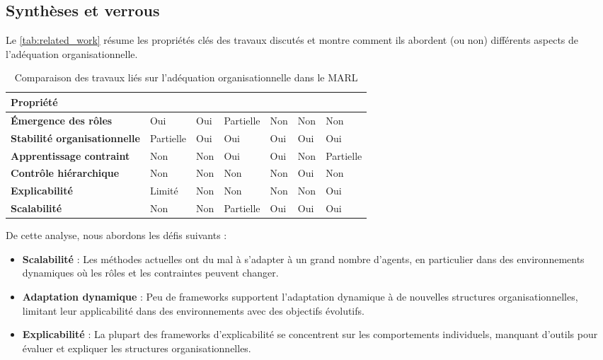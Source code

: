 \documentclass[sigconf,anonymous]{aamas}
\begin{document}
\subsection{Synthèses et verrous}
Le \autoref{tab:related_work} résume les propriétés clés des travaux discutés et montre comment ils abordent (ou non) différents aspects de l'adéquation organisationnelle.

\begin{table}[ht]
    \centering
    \small
    \renewcommand{\arraystretch}{1.3}
    \caption{Comparaison des travaux liés sur l'adéquation organisationnelle dans le MARL}
    \label{tab:related_work}
    \begin{tabular}{m{2.1cm} >{\centering\arraybackslash}m{0.8cm} >{\centering\arraybackslash}m{0.5cm} >{\centering\arraybackslash}m{0.8cm} >{\centering\arraybackslash}m{0.5cm} >{\centering\arraybackslash}m{0.5cm} >{\centering\arraybackslash}m{0.8cm}}

        \textbf{Propriété} & \textbf{\cite{yang2021role}} & \textbf{\cite{grover2018role}} & \textbf{\cite{borsa2019constrained}} & \textbf{\cite{zhang2020safemarl}} & \textbf{\cite{ghavamzadeh2006hrl}} & \textbf{\cite{foerster2018communication}} \\
        \hline \vspace{0.2cm}
        \textbf{Émergence des rôles} & Oui & Oui & Partielle & Non & Non & Non \\
        \textbf{Stabilité organisationnelle} & Partielle & Oui & Oui & Oui & Oui & Oui \\
        \textbf{Apprentissage contraint} & Non & Non & Oui & Oui & Non & Partielle \\
        \textbf{Contrôle hiérarchique} & Non & Non & Non & Non & Oui & Non \\
        \textbf{Explicabilité} & Limité & Non & Non & Non & Non & Oui \\
        \textbf{Scalabilité} & Non & Non & Partielle & Oui & Oui & Oui
    \end{tabular}%
\end{table}

\noindent De cette analyse, nous abordons les défis suivants :
\begin{itemize}
    \item \textbf{Scalabilité} : Les méthodes actuelles ont du mal à s'adapter à un grand nombre d'agents, en particulier dans des environnements dynamiques où les rôles et les contraintes peuvent changer.
    \item \textbf{Adaptation dynamique} : Peu de frameworks supportent l'adaptation dynamique à de nouvelles structures organisationnelles, limitant leur applicabilité dans des environnements avec des objectifs évolutifs.
    \item \textbf{Explicabilité} : La plupart des frameworks d'explicabilité se concentrent sur les comportements individuels, manquant d'outils pour évaluer et expliquer les structures organisationnelles.
\end{itemize}
\end{document}
